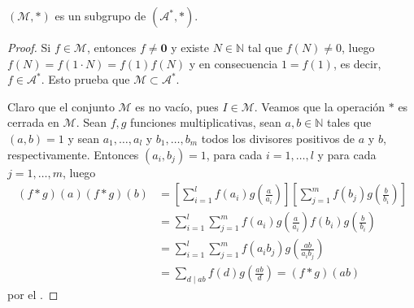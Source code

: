 \begin{theorem}\label{thm:sb1}
$(\mathcal{M},*)$ es un subgrupo de $(\mathcal{A}^*,*)$.
\end{theorem}
\begin{proof}
Si $f \in \mathcal{M}$, entonces $f \ne \mathbf{0}$ y existe $N \in \mathbb{N}$ tal que $f(N) \ne 0$, luego $f(N)=f(1 \cdot N)=f(1)f(N)$ y en consecuencia $1=f(1)$, es decir, $f \in \mathcal{A}^*$. Esto prueba que $\mathcal{M} \subset \mathcal{A}^*$.
\bigskip

Claro que el conjunto $\mathcal{M}$ es no vacío, pues $I \in \mathcal{M}$. Veamos que la operación $*$ es cerrada en $\mathcal{M}$. Sean $f,g$ funciones multiplicativas, sean $a,b \in \mathbb{N}$ tales que $(a,b)=1$ y sean $a_1,\ldots,a_l$ y $b_1,\ldots,b_m$ todos los divisores positivos de $a$ y $b$, respectivamente. Entonces $(a_i,b_j)=1$, para cada $i=1,\ldots,l$ y para cada $j=1,\ldots,m$, luego
\begin{align*}
	(f*g)(a)(f*g)(b) &= \left[ \sum_{i=1}^{l} f(a_i)g\left( \frac{a}{a_i} \right) \right]\left[ \sum_{j=1}^{m} f(b_j)g \left( \frac{b}{b_i} \right) \right] \\
					 &= \sum_{i=1}^{l} \sum_{j=1}^{m} f(a_i)g \left( \frac{a}{a_i} \right)f(b_i)g \left( \frac{b}{b_i} \right) \\
					 &= \sum_{i=1}^{l} \sum_{j=1}^{m} f(a_i b_j)g \left( \frac{a b}{a_i b_j} \right) \\
					 &= \sum_{d \mid a b}f(d)g \left( \frac{a b}{d} \right) = (f*g)(a b)
\end{align*}
por el .
\bigskip


\end{proof}
